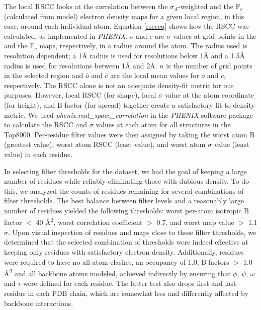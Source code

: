The local RSCC looks at the correlation between the $\sigma_{A}$-weighted \EDmap{} and the F$_{c}$ (calculated from model) electron density maps for a given local region, in this case, around each individual atom. Equation \ref{rscceq} shows how the RSCC was calculated\textcolor{changecolor}{, as implemented in \textit{PHENIX}}. $o$ and $c$ are $\sigma$ values at grid points in the \EDmap{} and the F$_{c}$ maps, respectively, in a radius around the atom. The radius used is resolution dependent; a 1\AA{} radius is used for resolutions below 1\AA{} and a 1.5\AA{} radius is used for resolutions between 1\AA{} and 2\AA{}. $n$ is the number of grid points in the selected region and $\bar{o}$ and $\bar{c}$ are the local mean values for $o$ and $c$, respectively. The RSCC alone is not an adequate density-fit metric for our purposes. However, local RSCC (for shape), local \EDmap{} $\sigma$ value at the atom coordinate (for height), and B factor (for spread) together create a satisfactory fit-to-density metric. We used \textit{phenix.real\_space\_correlation} in the \textit{PHENIX} software package \citep{Adams:2010fk} to calculate the RSCC and \EDmap{} $\sigma$ values at each atom for all structures in the Top8000. Per-residue filter values were then assigned by taking the worst atom B (greatest value), worst atom RSCC (least value), and worst atom \EDmap{} $\sigma$ value (least value) in each residue.

In selecting filter thresholds for the dataset, we had the goal of keeping a large number of residues while reliably eliminating those with dubious density. To do this, we analyzed the counts of residues remaining for several combinations of filter thresholds. The best balance between filter levels and a reasonably large number of residues yielded the following thresholds: \textcolor{changecolor}{worst per-atom isotropic} B factor $<$ 40 \AA\textsuperscript{2}, worst correlation coefficient $>$ 0.7, and worst map value $>$ 1.1 $\sigma$. Upon visual inspection of residues and maps close to these filter thresholds, we determined that the selected combination of thresholds were indeed effective at keeping only residues with satisfactory electron density. Additionally, residues were required to have no all-atom clashes, an occupancy of 1.0, B factors $>$ 1.0 \AA\textsuperscript{2} and all backbone atoms modeled, achieved indirectly by ensuring that $\phi$, $\psi$, $\omega$ and $\tau$ were defined for each residue.  The latter test also drops first and last residue in each PDB chain, which are somewhat less and differently affected by backbone interactions.


